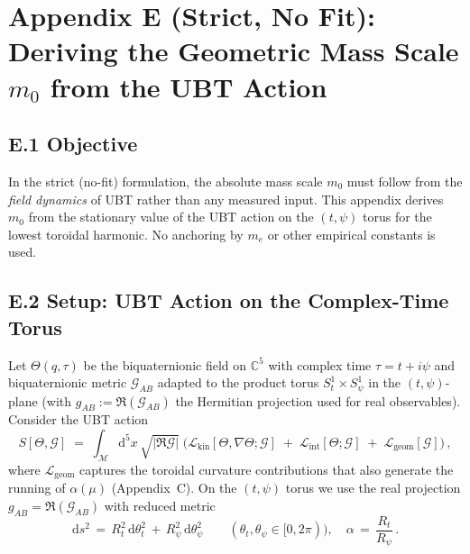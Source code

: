 
\appendix
\section*{Appendix E (Strict, No Fit): Deriving the Geometric Mass Scale $m_0$ from the UBT Action}

\subsection*{E.1 Objective}
In the strict (no-fit) formulation, the absolute mass scale $m_0$ must follow from the \emph{field dynamics} of UBT rather than any measured input. This appendix derives $m_0$ from the stationary value of the UBT action on the $(t,\psi)$ torus for the lowest toroidal harmonic. No anchoring by $m_e$ or other empirical constants is used.

\subsection*{E.2 Setup: UBT Action on the Complex-Time Torus}
Let $\Theta(q,\tau)$ be the biquaternionic field on $\mathbb{C}^5$ with complex time $\tau=t+i\psi$ and biquaternionic metric $\mathcal{G}_{AB}$ adapted to the product torus $S^1_t\times S^1_\psi$ in the $(t,\psi)$-plane (with $g_{AB}:=\Re(\mathcal{G}_{AB})$ the Hermitian projection used for real observables). Consider the UBT action
\begin{equation}
  S[\Theta,\mathcal{G}] \;=\; \int_{\mathcal{M}} \!\mathrm{d}^5x\,\sqrt{|\Re\mathcal{G}|}\;\Big(
     \mathcal{L}_{\text{kin}}[\Theta,\nabla\Theta;\mathcal{G}]
     \;+\; \mathcal{L}_{\text{int}}[\Theta;\mathcal{G}]
     \;+\; \mathcal{L}_{\text{geom}}[\mathcal{G}]\Big)\,,
  \label{eq:UBT-action}
\end{equation}
where $\mathcal{L}_{\text{geom}}$ captures the toroidal curvature contributions that also generate the running of $\alpha(\mu)$ (Appendix~C).
On the $(t,\psi)$ torus we use the real projection $g_{AB}=\Re(\mathcal{G}_{AB})$ with reduced metric
\begin{equation}
  \mathrm{d}s^2 \,=\, R_t^2\,\mathrm{d}\theta_t^2 \,+\, R_\psi^2\,\mathrm{d}\theta_\psi^2
  \qquad (\theta_t,\theta_\psi\in[0,2\pi)),\quad
  \alpha \,=\, \frac{R_t}{R_\psi}\,.
  \label{eq:torus-metric}
\end{equation}

